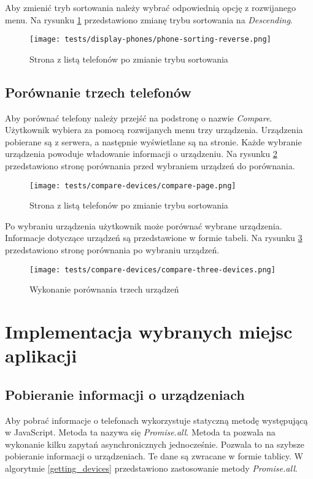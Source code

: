 Aby zmienić tryb sortowania należy wybrać odpowiednią opcję z rozwijanego menu. Na rysunku \ref{reverse_sorting} przedstawiono zmianę trybu sortowania na \textit{Descending}.
\begin{figure}[H]
  \centering
  \texttt{[image: tests/display-phones/phone-sorting-reverse.png]}
  \caption{Strona z listą telefonów po zmianie trybu sortowania}
  \label{reverse_sorting}
\end{figure}

\subsection{Porównanie trzech telefonów}
Aby porównać telefony należy przejść na podstronę o nazwie \textit{Compare}. Użytkownik wybiera za pomocą rozwijanych menu trzy urządzenia. Urządzenia pobierane są z serwera, a następnie wyświetlane są na stronie. Każde wybranie urządzenia powoduje władowanie informacji o urządzeniu. Na rysunku \ref{compare_page} przedstawiono stronę porównania przed wybraniem urządzeń do porównania.
\begin{figure}[H]
  \centering
  \texttt{[image: tests/compare-devices/compare-page.png]}
  \caption{Strona z listą telefonów po zmianie trybu sortowania}
  \label{compare_page}
\end{figure}

Po wybraniu urządzenia użytkownik może porównać wybrane urządzenia. Informacje dotyczące urządzeń są przedstawione w formie tabeli. Na rysunku \ref{compare_three_devices} przedstawiono stronę porównania po wybraniu urządzeń.

\begin{figure}[H]
  \centering
  \texttt{[image: tests/compare-devices/compare-three-devices.png]}
  \caption{Wykonanie porównania trzech urządzeń}
  \label{compare_three_devices}
\end{figure}

\section{Implementacja wybranych miejsc aplikacji}

\subsection*{Pobieranie informacji o urządzeniach}
Aby pobrać informacje o telefonach wykorzystuje statyczną metodę występującą w JavaScript. Metoda ta nazywa się \textit{Promise.all}. Metoda ta pozwala na wykonanie kilku zapytań asynchronicznych jednocześnie. Pozwala to na szybsze pobieranie informacji o urządzeniach. Te dane są zwracane w formie tablicy. W algorytmie \ref{getting_devices} przedstawiono zastosowanie metody \textit{Promise.all}.

